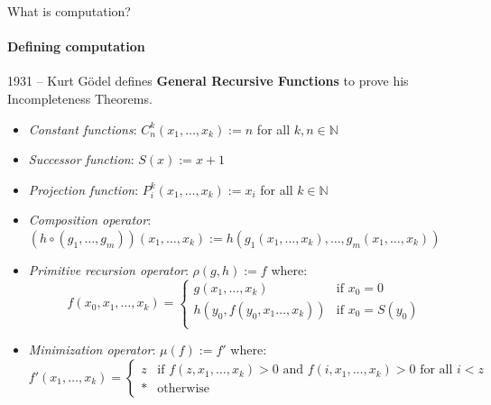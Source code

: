 \documentclass{beamer}
\newcommand{\N}{\mathbb{N}}
\begin{document}
\begin{frame}{What is computation?}
\framesubtitle{Defining computation}

    1931 -- Kurt Gödel defines \textbf{General Recursive Functions} to prove his Incompleteness Theorems.
    
    \begin{itemize}
    \item \textit{Constant functions}: $C_n^k(x_1, \ldots, x_k) := n$ for all $k,n \in \N$
    \item \textit{Successor function}: $S(x) := x+1$
    \item \textit{Projection function}: $P^k_i(x_1, \ldots, x_k) := x_i$ for all $k \in \N$
    \item \textit{Composition operator}: $(h \circ (g_1, \ldots, g_m))(x_1, \ldots, x_k) := h(g_1(x_1, \ldots, x_k), \ldots, g_m(x_1, \ldots, x_k))$
    \item \textit{Primitive recursion operator}: $\rho(g,h) := f$ where:
    \[f(x_0, x_1, \ldots, x_k) = \left \{ \begin{array}{ll}
        g(x_1, \ldots, x_k) & \text{if } x_0 = 0 \\
        h(y_0, f(y_0, x_1 \ldots, x_k)) & \text{if } x_0 = S(y_0) \\
    \end{array}\right .\]

    \item \textit{Minimization operator}: $\mu(f) := f'$ where:
    \[f'(x_1, \ldots, x_k) = \left \{ \begin{array}{ll}
        z & \text{if $f(z, x_1, \ldots, x_k) > 0$ and $f(i, x_1, \ldots, x_k) > 0$  for all $i <  z$}  \\
        * & \text{otherwise}
    \end{array}\right .\]
    \end{itemize}
\end{frame}
\end{document}
